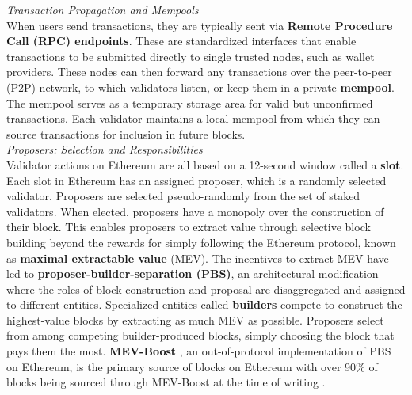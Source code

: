 \documentclass[a4paper]{article}
\theoremstyle{boldstyle}
\newcommand{\qb}[1]{\textcolor{red}{\textbf{Quentin:} #1}}
\newcommand{\todoqb}[1]{\todo[color=red!40]{\textbf{Quentin:} #1}}
\begin{document}
    \textit{Transaction Propagation and Mempools} \\
        When users send transactions, they are typically sent via \textbf{Remote Procedure Call (RPC) endpoints}. These are standardized interfaces that enable transactions to be submitted directly to single trusted nodes, such as wallet providers. These nodes can then forward any transactions over the peer-to-peer (P2P) network, to which validators listen, or keep them in a private \textbf{mempool}. The mempool serves as a temporary storage area for valid but unconfirmed transactions. Each validator maintains a local mempool from which they can source transactions for inclusion in future blocks. \\
        

    \textit{Proposers: Selection and Responsibilities} \\
        Validator actions on Ethereum are all based on a 12-second window called a \textbf{slot}. Each slot in Ethereum has an assigned proposer, which is a randomly selected validator. Proposers are selected pseudo-randomly from the set of staked validators. When elected, proposers have a monopoly over the construction of their block. This enables proposers to extract value through selective block building beyond the rewards for simply following the Ethereum protocol, known as \textbf{maximal extractable value} (MEV).
        The incentives to extract MEV have led to \textbf{proposer-builder-separation (PBS)}, an architectural modification where the roles of block construction and proposal are disaggregated and assigned to different entities. Specialized entities called \textbf{builders} compete to construct the highest-value blocks by extracting as much MEV as possible. 
        Proposers select from among competing builder-produced blocks, simply choosing the block that pays them the most. \textbf{MEV-Boost} \cite{MEV-Boost}, an out-of-protocol implementation of PBS on Ethereum, is the primary source of blocks on Ethereum with over 90\% of blocks being sourced through MEV-Boost at the time of writing \cite{MEV.pics}. \\
\end{document}
